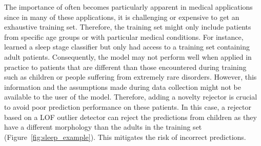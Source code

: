 The importance of  often becomes particularly apparent in medical applications since in many of these applications, it is challenging or expensive to get an exhaustive training set. Therefore, the training set might only include patients from specific age groups or with particular medical conditions. 
For instance, \citet{VanderPlas2021} learned a sleep stage classifier but only had access to a training set containing adult patients. Consequently, the model may not perform well when applied in practice to patients that are different than those encountered during training such as children or people suffering from extremely rare disorders. However, this information and the assumptions made during data collection might not be available to the user of the model. 
Therefore, adding a novelty rejector is crucial to avoid poor prediction performance on these patients. In this case, a rejector based on a LOF outlier detector can reject the predictions from children as they have a different morphology than the adults in the training set (Figure~\ref{fig:sleep_example}). This mitigates the risk of incorrect predictions. 





